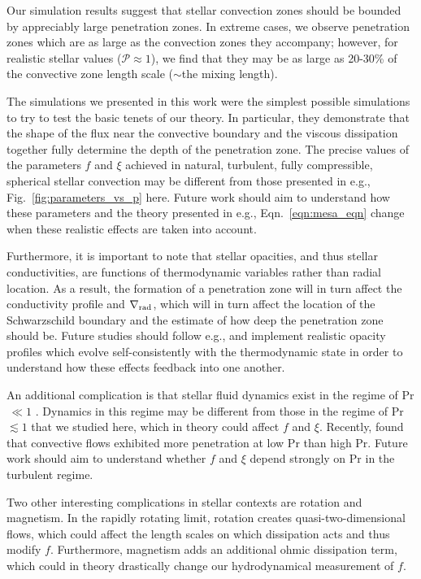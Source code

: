 \documentclass[twocolumn]{aastex631}
\newcommand{\gradrad}{\ensuremath{\nabla_{\rm{rad}}}}
\newcommand{\mP}{\ensuremath{\mathcal{P}}}
\newcommand\Pran{\ensuremath{\mathrm{Pr}}}
\begin{document}
Our simulation results suggest that stellar convection zones should be bounded by appreciably large penetration zones.
In extreme cases, we observe penetration zones which are as large as the convection zones they accompany; however, for realistic stellar values ($\mP \approx 1$), we find that they may be as large as 20-30\% of the convective zone length scale ($\sim$the mixing length).

The simulations we presented in this work were the simplest possible simulations to try to test the basic tenets of our theory.
In particular, they demonstrate that the shape of the flux near the convective boundary and the viscous dissipation together fully determine the depth of the penetration zone.
The precise values of the parameters $f$ and $\xi$ achieved in natural, turbulent, fully compressible, spherical stellar convection may be different from those presented in e.g., Fig.~\ref{fig:parameters_vs_p} here.
Future work should aim to understand how these parameters and the theory presented in e.g., Eqn.~\ref{eqn:mesa_eqn} change when these realistic effects are taken into account.

Furthermore, it is important to note that stellar opacities, and thus stellar conductivities, are functions of thermodynamic variables rather than radial location.
As a result, the formation of a penetration zone will in turn affect the conductivity profile and $\gradrad$, which will in turn affect the location of the Schwarzschild boundary and the estimate of how deep the penetration zone should be.
Future studies should follow e.g., \citet{kapyla_etal_2017} and implement realistic opacity profiles which evolve self-consistently with the thermodynamic state in order to understand how these effects feedback into one another.

An additional complication is that stellar fluid dynamics exist in the regime of Pr$\,\ll1$ \citep{garaud2021}.
Dynamics in this regime may be different from those in the regime of Pr $\lesssim 1$ that we studied here, which in theory could affect $f$ and $\xi$.
Recently, \citet{kapyla2021} found that convective flows exhibited more penetration at low Pr than high Pr.
Future work should aim to understand whether $f$ and $\xi$ depend strongly on $\Pran$ in the turbulent regime.

Two other interesting complications in stellar contexts are rotation and magnetism.
In the rapidly rotating limit, rotation creates quasi-two-dimensional flows, which could affect the length scales on which dissipation acts and thus modify $f$.
Furthermore, magnetism adds an additional ohmic dissipation term, which could in theory drastically change our hydrodynamical measurement of $f$.
\end{document}
